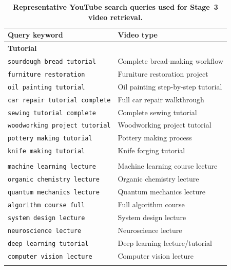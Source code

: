 \documentclass{article}
\begin{document}
\begin{table}[t]
  \caption{\textbf{Representative YouTube search queries used for Stage~3 video retrieval.}}
  \label{tab:yt-queries}
  \centering
  \small
  \setlength{\tabcolsep}{4pt}
  \renewcommand{\arraystretch}{1.05}
  \begin{tabular}{p{}p{}}
    \toprule
    \textbf{Query keyword} & \textbf{Video type} \\
    \midrule
    \multicolumn{2}{l}{\textbf{Tutorial}} \\
    \texttt{sourdough bread tutorial} & Complete bread-making workflow \\
    \texttt{furniture restoration} & Furniture restoration project \\
    \texttt{oil painting tutorial} & Oil painting step-by-step tutorial \\
    \texttt{car repair tutorial complete} & Full car repair walkthrough \\
    \texttt{sewing tutorial complete} & Complete sewing tutorial \\
    \texttt{woodworking project tutorial} & Woodworking project tutorial \\
    \texttt{pottery making tutorial} & Pottery making process \\
    \texttt{knife making tutorial} & Knife forging tutorial \\
    \addlinespace[0.3em]

    \multicolumn{2}{l}{\textbf{Lecture}} \\
    \texttt{machine learning lecture} & Machine learning course lecture \\
    \texttt{organic chemistry lecture} & Organic chemistry lecture \\
    \texttt{quantum mechanics lecture} & Quantum mechanics lecture \\
    \texttt{algorithm course full} & Full algorithm course \\
    \texttt{system design lecture} & System design lecture \\
    \texttt{neuroscience lecture} & Neuroscience lecture \\
    \texttt{deep learning tutorial} & Deep learning lecture/tutorial \\
    \texttt{computer vision lecture} & Computer vision lecture \\
    \addlinespace[0.3em]


\end{tabular}
\end{table}
\end{document}
